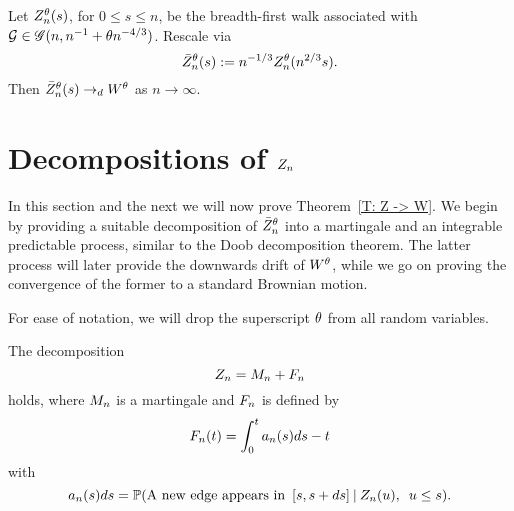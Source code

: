 \begin{theorem} \label{T: Z -> W}
	Let $Z_n^{\theta}(s)$, for $0 \leq s \leq n$, 
	be the breadth-first walk associated with $\mathcal{G} \in \mathscr{G}(n, n^{-1} + \theta n^{-4/3})$.
	Rescale via
	\begin{equation*}
	\bar{Z}_n^\theta(s) := n^{-1 / 3} Z_n^{\theta}(n^{2 / 3}s).
	\end{equation*}
	Then $\bar{Z}_n^\theta(s) \rightarrow_d W^{\theta}$ as $n \rightarrow \infty$.
\end{theorem}



\section{Decompositions of $Z_n$}

In this section and the next we will now prove Theorem~\ref{T: Z -> W}.
We begin by providing a suitable decomposition of $\bar{Z}^{\theta}_n$ into a martingale and
an integrable predictable process, similar to the Doob decomposition theorem.
The latter process will later provide the downwards drift of $W^{\theta}$,
while we go on proving the convergence of the former to a standard Brownian motion.

For ease of notation, we will drop the superscript $\theta$ from all random variables.

\begin{lemma} \label{L: decomp Zn}
	The decomposition 
	\begin{equation} \label{E: decomp Zn}
	Z_n = M_n + F_n
	\end{equation}
	holds, where $M_n$ is a martingale and $F_n$ is defined by
	\begin{equation} \label{D: An}
	F_n(t) = \int_{0}^{t} a_n(s)ds - t
	\end{equation}
	with
	\begin{equation} \label{D: an}
	a_n(s)ds = \mathbb{P}(\text{A new edge appears in} \enspace [s, s+ds] \: | \: Z_n(u), \enspace u \leq s).
	\end{equation}
\end{lemma}

